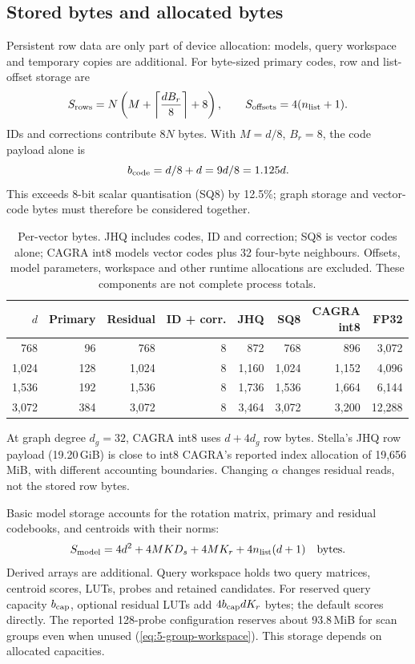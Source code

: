 \subsection{Stored bytes and allocated bytes}

Persistent row data are only part of device allocation: models, query
workspace and temporary copies are additional. For byte-sized primary
codes, row and list-offset storage are
\begin{equation}
 S_{\rm rows}=N\left(M+\left\lceil\frac{dB_r}{8}\right\rceil+8\right),
 \qquad S_{\rm offsets}=4(n_{\rm list}+1).
 \label{eq:4-row-storage}
\end{equation}
IDs and corrections contribute $8N$ bytes. With $M=d/8$, $B_r=8$,
the code payload alone is
\[
 b_{\rm code}=d/8+d=9d/8=1.125d.
\]
This exceeds 8-bit scalar quantisation (SQ8) by 12.5\%; graph storage
and vector-code bytes must therefore be considered together.

\begin{table}[!htbp]
\centering
\caption[Per-vector storage model]{Per-vector bytes. JHQ includes codes, ID and correction; SQ8 is
vector codes alone; CAGRA int8 models vector codes plus 32 four-byte
neighbours. Offsets, model parameters, workspace and other runtime
allocations are excluded. These components are not complete process totals.}
\label{tab:4-bytes}
\footnotesize\setlength{\tabcolsep}{4pt}
\begin{tabular}{@{}rrrrrrrr@{}}
\toprule
$d$ & Primary & Residual & ID + corr. & JHQ & SQ8 & \shortstack{CAGRA\\int8} & FP32 \\
\midrule
768 & 96 & 768 & 8 & 872 & 768 & 896 & 3,072 \\
1,024 & 128 & 1,024 & 8 & 1,160 & 1,024 & 1,152 & 4,096 \\
1,536 & 192 & 1,536 & 8 & 1,736 & 1,536 & 1,664 & 6,144 \\
3,072 & 384 & 3,072 & 8 & 3,464 & 3,072 & 3,200 & 12,288 \\
\bottomrule
\end{tabular}
\end{table}

At graph degree $d_g=32$, CAGRA int8 uses $d+4d_g$ row bytes. Stella's
JHQ row payload (19.20\,GiB) is close to int8 CAGRA's reported index
allocation of 19,656\,MiB, with different accounting boundaries.
Changing $\alpha$ changes residual reads, not the stored row bytes.

Basic model storage accounts for the rotation matrix, primary and
residual codebooks, and centroids with their norms:
\[
 S_{\rm model}
 =4d^2+4MKD_s+4MK_r+4n_{\rm list}(d+1)
 \quad\text{bytes}.
\]
Derived arrays are additional. Query workspace holds two query matrices,
centroid scores, LUTs, probes and retained candidates. For reserved query
capacity $b_{\rm cap}$, optional residual LUTs add $4b_{\rm cap}dK_r$
bytes; the default scores directly. The reported 128-probe configuration
reserves about 93.8\,MiB for scan groups even when unused
(\cref{eq:5-group-workspace}). This storage depends on allocated capacities.

